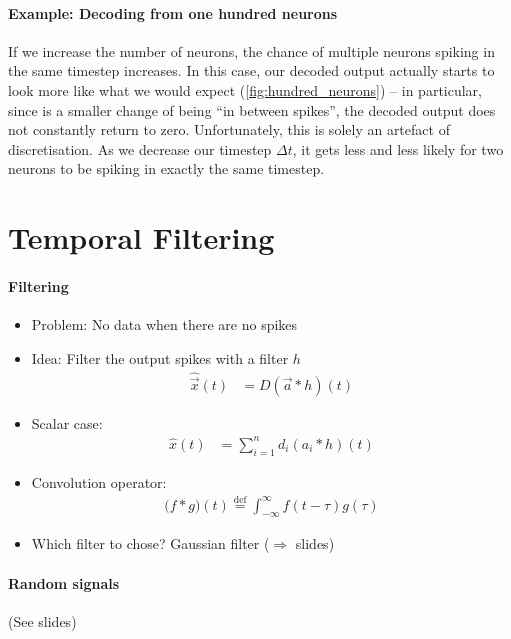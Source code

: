 \documentclass[10pt,letterpaper,oneside]{article}
\begin{document}
\paragraph{Example: Decoding from one hundred neurons}
If we increase the number of neurons, the chance of multiple neurons spiking in the same timestep increases. In this case, our decoded output actually starts to look more like what we would expect (\cref{fig:hundred_neurons}) -- in particular, since is a smaller change of being \enquote{in between spikes}, the decoded output does not constantly return to zero. Unfortunately, this is solely an artefact of discretisation. As we decrease our timestep $\Delta t$, it gets less and less likely for two neurons to be spiking in exactly the same timestep.


\section{Temporal Filtering}


\paragraph{Filtering}
\begin{itemize}
	\item Problem: No data when there are no spikes
	\item Idea: Filter the output spikes with a filter $h$
	\begin{align*}
		\hat{\vec x}(t) &= D (\vec a \ast h)(t)
	\end{align*}
	\item Scalar case:
	\begin{align*}
		\hat x(t) &= \sum_{i = 1}^n d_i (a_i \ast h)(t)
	\end{align*}
	\item Convolution operator:
	\begin{align*}
		\big( f \ast g \big)(t) \overset{\text{def}}= \int_{-\infty}^{\infty} f(t - \tau) g(\tau)
	\end{align*}
	\item Which filter to chose? Gaussian filter ($\Rightarrow$ slides)
\end{itemize}

\paragraph{Random signals}

(See slides)
\end{document}

